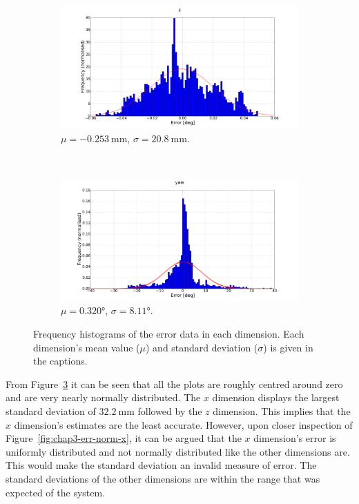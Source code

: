\begin{figure}
  \begin{subfigure}{0.48\textwidth}
     \includegraphics[clip, trim = 120 0 120 0, width=\textwidth]{figures/chapter3/norm_z}
     \caption{$\mu = \SI{-0.253}{\mm}$, $\sigma = \SI{20.8}{\mm}$.}
  \label{fig:norm-z}
  \end{subfigure}
~
\begin{subfigure}{0.48\textwidth}
     \includegraphics[clip, trim = 120 0 120 0, width=\textwidth]{figures/chapter3/norm_yaw}
     \caption{$\mu = \ang{0.320}$, $\sigma = \ang{8.11}$. }
  \label{fig:norm-yaw}
  \end{subfigure}
  \caption[Frequency histograms of the error data in each dimension.]{Frequency histograms of the error data in each dimension. Each dimension's mean value ($\mu$) and standard deviation ($\sigma$) is given in the captions. }
  \label{fig:err-norm}
\end{figure}

From Figure~\ref{fig:err-norm} it can be seen that all the plots are roughly centred around zero and are very nearly normally distributed. The $x$ dimension displays the largest standard deviation of $\SI{32.2}{\mm}$ followed by the $z$ dimension. This implies that the $x$ dimension's estimates are the least accurate. However, upon closer inspection of Figure~\ref{fig:chap3-err-norm-x}, it can be argued that the $x$ dimension's error is uniformly distributed and not normally distributed like the other dimensions are. This would make the standard deviation an invalid measure of error. The standard deviations of the other dimensions are within the range that was expected of the system. 

